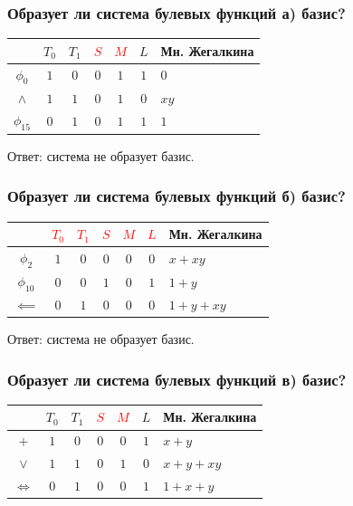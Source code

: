 \documentclass[12pt,a4paper]{article}
\theoremstyle{plain}
\theoremstyle{definition}
\theoremstyle{remark}
\numberwithin{equation}{section}
\begin{document}
\subsubsection{Образует ли система булевых функций а) базис?}

\noindent\begin{tabularx}{\linewidth}{|c|c|c|c|c|c|X|}
  \hline
               & $T_0$ & $T_1$ & \textcolor{red}{$S$} & \textcolor{red}{$M$} & $L$ & Мн. Жегалкина \\
  \hline
  $\phi_0$     &  $1$  &  $0$  & $0$ & $1$ & $1$ & $0$ \\
  $\land$      &  $1$  &  $1$  & $0$ & $1$ & $0$ & $xy$ \\
  $\phi_{15}$  &  $0$  &  $1$  & $0$ & $1$ & $1$ & $1$ \\
  \hline
\end{tabularx}

\vspace{0.5em}
\noindent Ответ: система не образует базис.

\subsubsection{Образует ли система булевых функций б) базис?}

\noindent\begin{tabularx}{\linewidth}{|c|c|c|c|c|c|X|}
  \hline
               & \textcolor{red}{$T_0$} & \textcolor{red}{$T_1$} & \textcolor{red}{$S$} & \textcolor{red}{$M$} & \textcolor{red}{$L$} & Мн. Жегалкина \\
  \hline
  $\phi_2$     &  $1$  &  $0$  & $0$ & $0$ & $0$ & $x + xy$ \\
  $\phi_{10}$  &  $0$  &  $0$  & $1$ & $0$ & $1$ & $1 + y$ \\
  $\impliedby$ &  $0$  &  $1$  & $0$ & $0$ & $0$ & $1 + y + xy$ \\
  \hline
\end{tabularx}

\vspace{0.5em}
\noindent Ответ: система не образует базис.

\subsubsection{Образует ли система булевых функций в) базис?}

\noindent\begin{tabularx}{\linewidth}{|c|c|c|c|c|c|X|}
  \hline
               & $T_0$ & $T_1$ & \textcolor{red}{$S$} & \textcolor{red}{$M$} & $L$ & Мн. Жегалкина \\
  \hline
  $+$          &  $1$  &  $0$  & $0$ & $0$ & $1$ & $x + y$ \\
  $\lor$       &  $1$  &  $1$  & $0$ & $1$ & $0$ & $x + y + xy$ \\
  $\iff$       &  $0$  &  $1$  & $0$ & $0$ & $1$ & $1 + x + y$ \\
  \hline
\end{tabularx}
\end{document}
